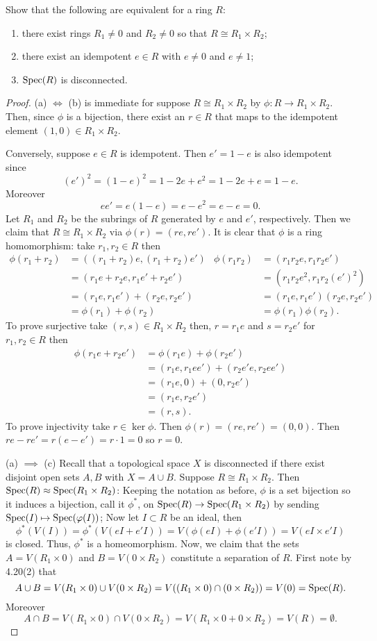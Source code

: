 \newpage
\begin{problem}
Show that the following are equivalent for a ring $R$:
\begin{enumerate}[noitemsep,label=(\alph*)]
\item there exist rings $R_1\neq 0$ and $R_2\neq 0$ so that
  $R\cong R_1\times R_2$;
\item there exist an idempotent $e\in R$ with $e\neq 0$ and
  $e\neq 1$;
\item $\operatorname{Spec}(R)$ is disconnected.
\end{enumerate}
\end{problem}
\begin{proof}
(a) $\iff$ (b) is immediate for suppose $R\cong R_1\times
R_2$ by $\phi\colon R\to R_1\times R_2$. Then, since $\phi$ is a
bijection, there exist an $r\in R$ that maps to the idempotent
element $(1,0)\in R_1\times R_2$.

Conversely, suppose $e\in R$ is idempotent. Then $e'=1-e$ is also
idempotent since
\[
(e')^2=(1-e)^2=1-2e+e^2=1-2e+e=1-e.
\]
Moreover
\[
ee'=e(1-e)=e-e^2=e-e=0.
\]
Let $R_1$ and $R_2$ be the subrings of $R$ generated by $e$ and
$e'$, respectively. Then we claim that $R\cong R_1\times R_2$ via
$\phi(r)=(re,re')$. It is clear that $\phi$ is a ring
homomorphism: take $r_1,r_2\in R$ then
\begin{align*}
\phi(r_1+r_2)&=((r_1+r_2)e,(r_1+r_2)e')&
\phi(r_1r_2)&=(r_1r_2e,r_1r_2e')\\
&=(r_1e+r_2e,r_1e'+r_2e')&
&=\left(r_1r_2e^2,r_1r_2(e')^2\right)\\
&=(r_1e,r_1e')+(r_2e,r_2e')&
&=(r_1e,r_1e')(r_2e,r_2e')\\
&=\phi(r_1)+\phi(r_2)&
&=\phi(r_1)\phi(r_2).
\end{align*}
To prove surjective take $(r,s)\in R_1\times
R_2$ then, $r=r_1e$ and $s=r_2e'$ for $r_1,r_2\in R$ then
\begin{align*}
\phi(r_1e+r_2e')&=\phi(r_1e)+\phi(r_2e')\\
&=(r_1e,r_1ee')+(r_2e'e,r_2ee')\\
&=(r_1e,0)+(0,r_2e')\\
&=(r_1e,r_2e')\\
&=(r,s).
\end{align*}
To prove injectivity take $r\in\ker\phi$. Then
$\phi(r)=(re,re')=(0,0)$. Then $re-re'=r(e-e')=r\cdot 1=0$ so
$r=0$.

(a) $\implies$ (c) Recall that a topological space $X$ is
disconnected if there exist disjoint open sets $A,B$ with
$X=A\cup B$. Suppose $R\cong R_1\times R_2$. Then
$\operatorname{Spec}(R)\approx \operatorname{Spec}(R_1\times R_2)$: Keeping the notation as
before, $\phi$ is a set bijection so it induces a bijection, call
it $\phi^*$, on $\operatorname{Spec}(R)\to\operatorname{Spec}(R_1\times R_2)$ by sending
$\operatorname{Spec}(I)\mapsto\operatorname{Spec}(\varphi(I))$; Now let $I\subset R$ be an
ideal, then
\[
\phi^*(V(I))=\phi^*\left(V(eI+e'I)\right)=V(\phi(eI)+\phi(e'I))=V(eI\times e'I)
\]
is closed. Thus, $\phi^*$ is a homeomorphism. Now, we claim that
the sets $A=V(R_1\times 0)$ and $B=V(0\times R_2)$ constitute a
separation of $R$. First note by 4.20(2) that
\[
A\cup B=V(R_1\times 0)\cup V(0\times R_2)=V((R_1\times
0)\cap(0\times R_2))=V(0)=\operatorname{Spec}(R).
\]
Moreover
\[
A\cap B=V(R_1\times 0)\cap V(0\times R_2)=V(R_1\times 0+0\times R_2)=V(R)=\emptyset.
\]


\end{proof}
